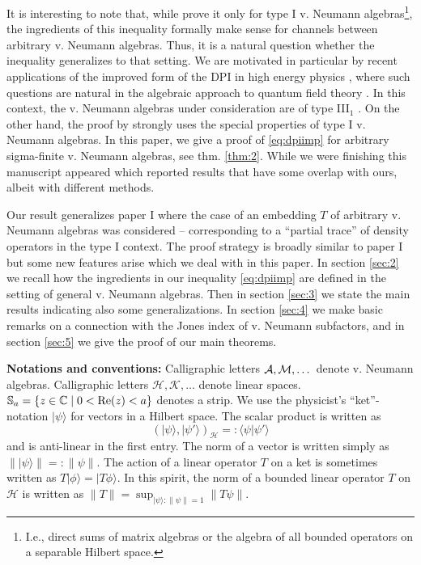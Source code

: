 \documentclass[english,a4paper,12pt]{article}
\def\sH{\mathscr{H}}
\def\sK{\mathscr{K}}
\def\bS{{\mathbb S}}
\def\cA{{\mathfrak A}}
\def\cM{{\mathfrak M}}
\newcommand{\ca}[1]{{\cal #1}}
\newcommand{\ben}{\begin{equation}}
\newcommand{\een}{\end{equation}}
\def\cA{{\ca A}}
\def\cM{{\ca M}}
\newcommand{\CC}{\mathbb{C}}
\renewcommand{\Re}{{\rm Re}}
\begin{document}
It is interesting to note that, while \cite{Junge} prove it only for type I v. Neumann algebras\footnote{I.e., direct sums of matrix algebras or the algebra of all bounded operators on a separable Hilbert space.}, the ingredients of this inequality formally make sense for channels between arbitrary v. Neumann algebras. Thus, it is a natural question whether the inequality generalizes to that setting. We are motivated in particular by recent applications of the improved form of the DPI in high energy physics \cite{swingle,Faulkner}, where such questions are natural in the algebraic approach to quantum field theory \cite{haag_2}. In this context, the v. Neumann algebras under consideration are of type III$_1$ \cite{Buchholz}. On the other hand, the proof by 
\cite{Junge} strongly uses the special properties of type I v. Neumann algebras. In this paper, we give a proof of \eqref{eq:dpiimp} for arbitrary sigma-finite v. Neumann algebras, see thm. \ref{thm:2}.  While we were finishing this manuscript \cite{Junge:2020bwo} appeared which reported results that have some overlap with ours, albeit with different methods. 

Our result generalizes paper I where the case of an embedding $T$ of arbitrary v. Neumann algebras was considered -- corresponding to a ``partial trace'' of density operators in the type I context. The proof strategy is broadly similar to paper I but some new features arise which we deal with in this paper. In section 
\ref{sec:2} we recall how the ingredients in our inequality \eqref{eq:dpiimp} are defined in the setting of general v. Neumann algebras. Then in section \ref{sec:3} we state the main results indicating 
also some generalizations. In section \ref{sec:4} we make basic remarks on a connection with the Jones index of v. Neumann subfactors, and in section 
\ref{sec:5} we give the proof of our main theorems. %

\medskip
\noindent
{\bf Notations and conventions:} Calligraphic letters $\cA, \cM, \dots$ denote v. Neumann algebras. Calligraphic letters $\sH, \sK, \dots$ denote linear spaces.  $\bS_a=\{z \in \CC \mid 0 < \Re (z) < a\}$ denotes a strip. We use the physicist's ``ket''-notation $|\psi\rangle$ for vectors in a Hilbert space. 
The scalar product is written as 
\ben
(|\psi\rangle, |\psi'\rangle)_{\sH} =: \langle \psi | \psi' \rangle
\een
and is anti-linear in the first entry. The norm of a vector is written simply as
$\| |\psi\rangle \| =: \| \psi \|$. The action of a linear operator $T$ on a ket is sometimes written as $T|\phi\rangle = |T\phi\rangle$. 
In this spirit, the norm of a bounded linear operator $T$ on $\sH$ is written as $\|T\|= \sup_{|\psi\rangle: \|\psi\|=1} \|T\psi\|$. 
\end{document}
